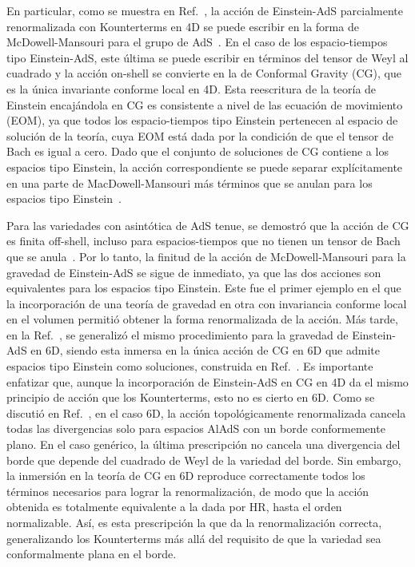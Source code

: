 \documentclass[../Main.tex]{subfiles}
\begin{document}
En particular, como se muestra en Ref.~\cite{Miskovic:2009bm}, la acción de Einstein-AdS parcialmente renormalizada con Kounterterms en 4D se puede escribir en la forma de McDowell-Mansouri para el grupo de AdS~\cite{Stelle:1976gc,MacDowell:1977jt}. En el caso de los espacio-tiempos tipo Einstein-AdS, este última se puede escribir en términos del tensor de Weyl al cuadrado y la acción on-shell se convierte en la de Conformal Gravity (CG), que es la única invariante conforme local en 4D. Esta reescritura de la teoría de Einstein encajándola en CG es consistente a nivel de las ecuación de movimiento (EOM), ya que todos los espacio-tiempos tipo Einstein pertenecen al espacio de solución de la teoría, cuya EOM está dada por la condición de que el tensor de Bach es igual a cero. Dado que el conjunto de soluciones de CG contiene a los espacios tipo Einstein, la acción correspondiente se puede separar explícitamente en una parte de MacDowell-Mansouri más términos que se anulan para los espacios tipo Einstein~\cite{Anastasiou:2016jix}.

Para las variedades con asintótica de AdS tenue, se demostró que la acción de CG es finita off-shell, incluso para espacios-tiempos que no tienen un tensor de Bach que se anula~\cite{Grumiller:2013mxa}. Por lo tanto, la finitud de la acción de McDowell-Mansouri para la gravedad de Einstein-AdS se sigue de inmediato, ya que las dos acciones son equivalentes para los espacios tipo Einstein. Este fue el primer ejemplo en el que la incorporación de una teoría de gravedad en otra con invariancia conforme local en el volumen permitió obtener la forma renormalizada de la acción. Más tarde, en la Ref.~\cite{Anastasiou:2020mik}, se generalizó el mismo procedimiento para la gravedad de Einstein-AdS en 6D, siendo esta inmersa en la única acción de CG en 6D que admite espacios tipo Einstein como soluciones, construida en Ref.~\cite {Lu:2011zk}. Es importante enfatizar que, aunque la incorporación de Einstein-AdS en CG en 4D da el mismo principio de acción que los Kounterterms, esto no es cierto en 6D. Como se discutió en Ref.~\cite{Anastasiou:2020zwc}, en el caso 6D, la acción topológicamente renormalizada cancela todas las divergencias solo para espacios AlAdS con un borde conformemente plano. En el caso genérico, la última prescripción no cancela una divergencia del borde que depende del cuadrado de Weyl de la variedad del borde. Sin embargo, la inmersión en la teoría de CG en 6D reproduce correctamente todos los términos necesarios para lograr la renormalización, de modo que la acción obtenida es totalmente equivalente a la dada por HR, hasta el orden normalizable. Así, es esta prescripción la que da la renormalización correcta, generalizando los Kounterterms más allá del requisito de que la 
 variedad sea conformalmente plana en el borde.
\end{document}
